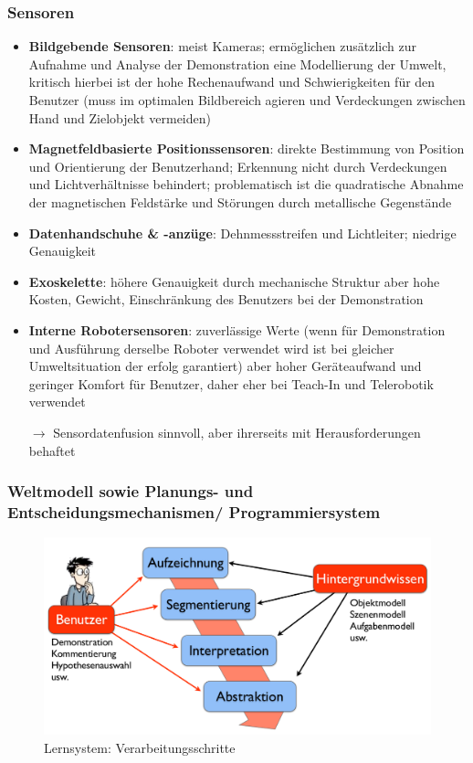 \subsubsection*{Sensoren}
\begin{itemize}
\item \textbf{Bildgebende Sensoren}: meist Kameras; ermöglichen zusätzlich zur Aufnahme und Analyse der Demonstration eine Modellierung der Umwelt, kritisch hierbei ist der hohe Rechenaufwand und Schwierigkeiten für den Benutzer (muss im optimalen Bildbereich agieren und Verdeckungen zwischen Hand und Zielobjekt vermeiden)
\item \textbf{Magnetfeldbasierte Positionssensoren}: direkte Bestimmung von Position und Orientierung der Benutzerhand; Erkennung nicht durch Verdeckungen und Lichtverhältnisse behindert; problematisch ist die quadratische Abnahme der magnetischen Feldstärke und Störungen durch metallische Gegenstände
\item \textbf{Datenhandschuhe \& -anzüge}: Dehnmessstreifen und Lichtleiter; niedrige Genauigkeit 
\item \textbf{Exoskelette}: höhere Genauigkeit durch mechanische Struktur aber hohe Kosten, Gewicht, Einschränkung des Benutzers bei der Demonstration  
\item \textbf{Interne Robotersensoren}: zuverlässige Werte (wenn für Demonstration und Ausführung derselbe Roboter verwendet wird ist bei gleicher Umweltsituation der erfolg garantiert) aber hoher Geräteaufwand und geringer Komfort für Benutzer, daher eher bei Teach-In und Telerobotik verwendet
\item[$\rightarrow$] Sensordatenfusion sinnvoll, aber ihrerseits mit Herausforderungen behaftet
\end{itemize}
\subsubsection*{Weltmodell sowie Planungs- und Entscheidungsmechanismen/ Programmiersystem}
\begin{figure}[ht]\centering 
\includegraphics[width=0.6\linewidth]{figures/ch03_verarbeitungsschritte.png}
\caption{Lernsystem: Verarbeitungsschritte}
\label{fig:ch03_verarb}
\end{figure}

